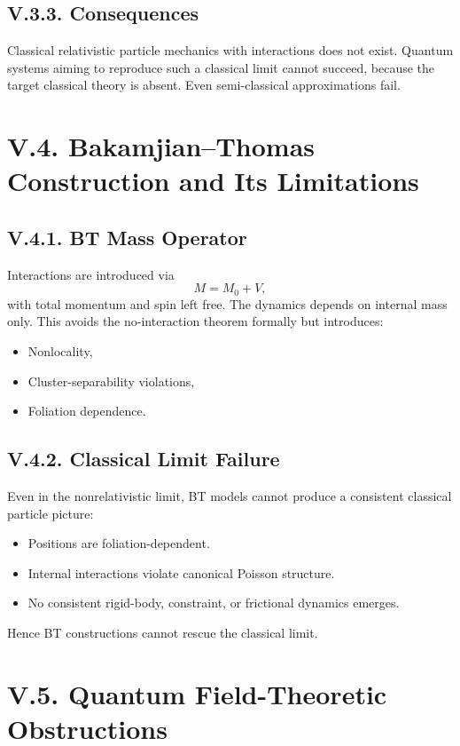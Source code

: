 \documentclass[12pt,oneside]{book}
\theoremstyle{plain}
\theoremstyle{definition}
\begin{document}
\subsection*{V.3.3. Consequences}

Classical relativistic particle mechanics with interactions does not exist. Quantum systems aiming to reproduce such a classical limit cannot succeed, because the target classical theory is absent. Even semi-classical approximations fail.

\section{V.4. Bakamjian–Thomas Construction and Its Limitations}

\subsection*{V.4.1. BT Mass Operator}

Interactions are introduced via
\[
M = M_0 + V,
\]
with total momentum and spin left free. The dynamics depends on internal mass only. This avoids the no-interaction theorem formally but introduces:

\begin{itemize}
    \item Nonlocality,
    \item Cluster-separability violations,
    \item Foliation dependence.
\end{itemize}

\subsection*{V.4.2. Classical Limit Failure}

Even in the nonrelativistic limit, BT models cannot produce a consistent classical particle picture:

\begin{itemize}
    \item Positions are foliation-dependent.
    \item Internal interactions violate canonical Poisson structure.
    \item No consistent rigid-body, constraint, or frictional dynamics emerges.
\end{itemize}

Hence BT constructions cannot rescue the classical limit.

\section{V.5. Quantum Field-Theoretic Obstructions}
\end{document}
